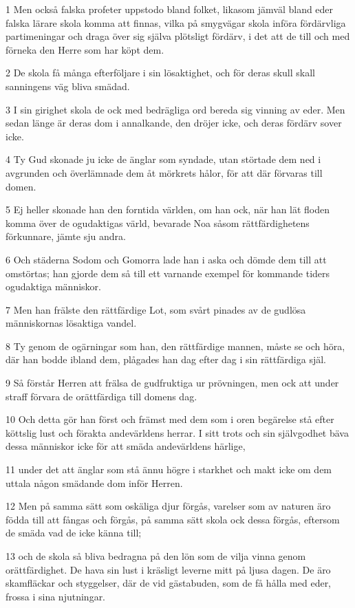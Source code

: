 \par 1 Men också falska profeter uppstodo bland folket, likasom jämväl bland eder falska lärare skola komma att finnas, vilka på smygvägar skola införa fördärvliga partimeningar och draga över sig själva plötsligt fördärv, i det att de till och med förneka den Herre som har köpt dem.
\par 2 De skola få många efterföljare i sin lösaktighet, och för deras skull skall sanningens väg bliva smädad.
\par 3 I sin girighet skola de ock med bedrägliga ord bereda sig vinning av eder. Men sedan länge är deras dom i annalkande, den dröjer icke, och deras fördärv sover icke.
\par 4 Ty Gud skonade ju icke de änglar som syndade, utan störtade dem ned i avgrunden och överlämnade dem åt mörkrets hålor, för att där förvaras till domen.
\par 5 Ej heller skonade han den forntida världen, om han ock, när han lät floden komma över de ogudaktigas värld, bevarade Noa såsom rättfärdighetens förkunnare, jämte sju andra.
\par 6 Och städerna Sodom och Gomorra lade han i aska och dömde dem till att omstörtas; han gjorde dem så till ett varnande exempel för kommande tiders ogudaktiga människor.
\par 7 Men han frälste den rättfärdige Lot, som svårt pinades av de gudlösa människornas lösaktiga vandel.
\par 8 Ty genom de ogärningar som han, den rättfärdige mannen, måste se och höra, där han bodde ibland dem, plågades han dag efter dag i sin rättfärdiga själ.
\par 9 Så förstår Herren att frälsa de gudfruktiga ur prövningen, men ock att under straff förvara de orättfärdiga till domens dag.
\par 10 Och detta gör han först och främst med dem som i oren begärelse stå efter köttslig lust och förakta andevärldens herrar. I sitt trots och sin självgodhet bäva dessa människor icke för att smäda andevärldens härlige,
\par 11 under det att änglar som stå ännu högre i starkhet och makt icke om dem uttala någon smädande dom inför Herren.
\par 12 Men på samma sätt som oskäliga djur förgås, varelser som av naturen äro födda till att fångas och förgås, på samma sätt skola ock dessa förgås, eftersom de smäda vad de icke känna till;
\par 13 och de skola så bliva bedragna på den lön som de vilja vinna genom orättfärdighet. De hava sin lust i kräsligt leverne mitt på ljusa dagen. De äro skamfläckar och styggelser, där de vid gästabuden, som de få hålla med eder, frossa i sina njutningar.
